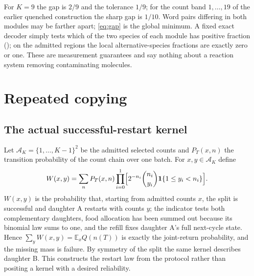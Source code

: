 \documentclass[11pt,a4paper]{article}
\theoremstyle{plain}
\theoremstyle{definition}
\theoremstyle{remark}
\newcommand{\EE}{\mathbb E}
\newcommand{\cA}{\mathcal A}
\begin{document}
For $K=9$ the gap is $2/9$ and the tolerance $1/9$; for the count band $1,\dots,19$ of the earlier quenched construction the sharp gap is $1/10$. Word pairs differing in both modules may be farther apart; \eqref{eq:gap} is the global minimum. A fixed exact decoder simply tests which of the two species of each module has positive fraction (); on the admitted regions the local alternative-species fractions are exactly zero or one. These are measurement guarantees and say nothing about a reaction system removing contaminating molecules.

\section{Repeated copying}\label{sec:repeat}
\subsection{The actual successful-restart kernel}
Let $\cA_K=\{1,\dots,K-1\}^2$ be the admitted selected counts and $P_T(x,n)$ the transition probability of the count chain over one batch. For $x,y\in\cA_K$ define
\begin{equation}\label{eq:kernel}
 W(x,y)=\sum_{n}P_T(x,n)\prod_{i=0}^{1}\Bigl[2^{-n_i}\binom{n_i}{y_i}\mathbf 1\{1\le y_i<n_i\}\Bigr].
\end{equation}
$W(x,y)$ is the probability that, starting from admitted counts $x$, the split is successful and daughter A restarts with counts $y$; the indicator tests both complementary daughters, food allocation has been summed out because its binomial law sums to one, and the refill fixes daughter A's full next-cycle state. Hence $\sum_yW(x,y)=\EE_xQ(n(T))$ is exactly the joint-return probability, and the missing mass is failure. By symmetry of the split the same kernel describes daughter B. This constructs the restart law from the protocol rather than positing a kernel with a desired reliability.
\end{document}
